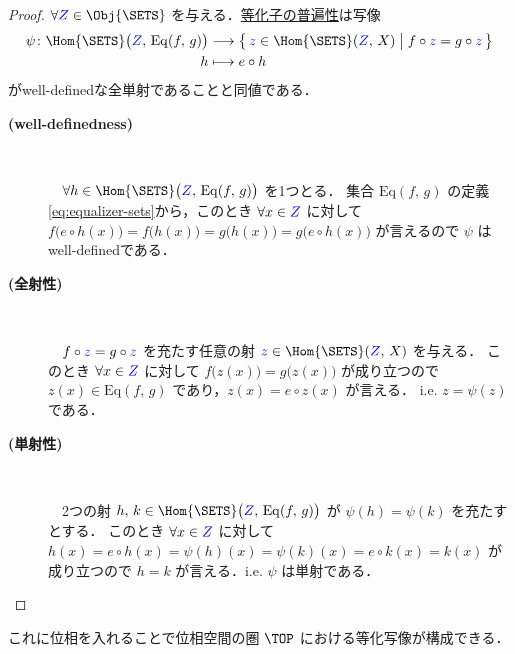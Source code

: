 \documentclass[geometry_main]{subfiles}
\begin{document}
\begin{proof}
	$\forall \textcolor{blue}{Z} \in \Obj{\SETS}$ を与える．\hyperref[cmtd:univ-equalizer]{等化子の普遍性}は写像
	\begin{align}
		\psi \colon \Hom{\SETS} \bigl(\textcolor{blue}{Z},\, \mathrm{Eq}(f,\, g)\bigr) &\lto \bigl\{\, \textcolor{blue}{z} \in \Hom{\SETS}(\textcolor{blue}{Z},\, X) \bigm| f \circ \textcolor{blue}{z} = g \circ  \textcolor{blue}{z} \,\bigr\} \\
		h &\lmto e \circ h
	\end{align}
	がwell-definedな全単射であることと同値である．
	\begin{description}
		\item[\textbf{(well-definedness)}] 　
		
		　$\forall h \in \Hom{\SETS} \bigl(\textcolor{blue}{Z},\, \mathrm{Eq}(f,\, g)\bigr)$ を1つとる．
		集合 $\mathrm{Eq}(f,\, g)$ の定義\eqref{eq:equalizer-sets}から，このとき $\forall x \in \textcolor{blue}{Z}$ に対して $f \bigl( e \circ h(x) \bigr) =  f \bigl( h(x) \bigr) = g \bigl( h(x) \bigr) = g \bigl( e \circ h(x) \bigr)$ が言えるので $\psi$ はwell-definedである．
		
		\item[\textbf{(全射性)}] 　
		
		　$f \circ \textcolor{blue}{z} = g \circ \textcolor{blue}{z}$ を充たす任意の射 $\textcolor{blue}{z} \in \Hom{\SETS}(\textcolor{blue}{Z},\, X)$ を与える．
		このとき $\forall x \in \textcolor{blue}{Z}$ に対して $f \bigl(z(x)\bigr) = g \bigl( z(x) \bigr)$ が成り立つので $z(x) \in \mathrm{Eq}(f,\, g)$ であり，$z(x) = e \circ z(x)$ が言える．
		i.e. $z = \psi(z)$ である．

		\item[\textbf{(単射性)}] 　
		
		　2つの射 $h,\, k \in \Hom{\SETS}\bigl(\textcolor{blue}{Z},\, \mathrm{Eq}(f,\, g)\bigr)$ が $\psi(h) = \psi(k)$ を充たすとする．
		このとき $\forall x \in \textcolor{blue}{Z}$ に対して $h(x) = e \circ h(x) = \psi(h)(x) = \psi(k)(x) = e \circ k(x) = k(x)$ が成り立つので $h = k$ が言える．i.e. $\psi$ は単射である．
	\end{description}
\end{proof}

これに位相を入れることで位相空間の圏 $\TOP$ における等化写像が構成できる．
\end{document}
